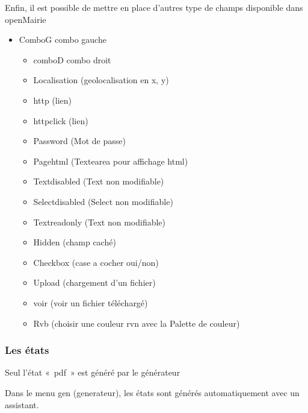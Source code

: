\documentclass[letterpaper,10pt,french]{manual}
\begin{document}
Enfin, il est possible de mettre en place d'autres type de champs disponible dans openMairie
\begin{itemize}
\item {} 
ComboG  combo gauche
\begin{itemize}
\item {} 
comboD combo droit

\item {} 
Localisation (geolocalisation en x, y)

\item {} 
http (lien)

\item {} 
httpclick (lien)

\item {} 
Password (Mot de passe)

\item {} 
Pagehtml (Textearea pour affichage html)

\item {} 
Textdisabled (Text non modifiable)

\item {} 
Selectdisabled (Select non modifiable)

\item {} 
Textreadonly (Text non modifiable)

\item {} 
Hidden (champ caché)

\item {} 
Checkbox (case a cocher oui/non)

\item {} 
Upload (chargement d'un fichier)

\item {} 
voir (voir un fichier téléchargé)

\item {} 
Rvb (choisir une couleur rvn avec la Palette de couleur)

\end{itemize}

\end{itemize}


\subsubsection{Les états}

Seul l'état « pdf » est généré par le générateur

Dans le menu gen (generateur), les états sont générés automatiquement avec un assistant.
\end{document}
